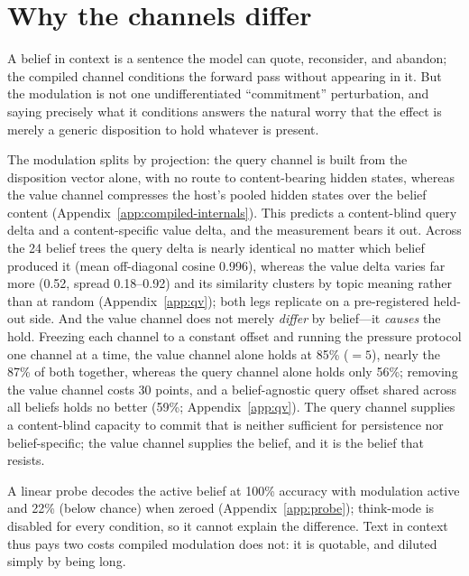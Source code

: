 \section{Why the channels differ}
\label{sec:why-channels-differ}

A belief in context is a sentence the model can quote, reconsider, and abandon; the compiled
channel conditions the forward pass without appearing in it. But the modulation is not one
undifferentiated ``commitment'' perturbation, and saying precisely what it conditions answers
the natural worry that the effect is merely a generic disposition to hold whatever is present.

The modulation splits by projection: the query channel is built from the disposition vector
alone, with no route to content-bearing hidden states, whereas the value channel compresses
the host's pooled hidden states over the belief content (Appendix~\ref{app:compiled-internals}). This
predicts a content-blind query delta and a content-specific value delta, and the measurement
bears it out. Across the 24 belief trees the query delta is nearly identical no matter which
belief produced it (mean off-diagonal cosine 0.996), whereas the value delta varies far more
(0.52, spread 0.18--0.92) and its similarity clusters by topic meaning rather than at random
(Appendix~\ref{app:qv}); both legs replicate on a pre-registered held-out
side. And the value channel does not merely
\emph{differ} by belief---it \emph{causes} the hold. Freezing each channel to a constant offset
and running the pressure protocol one channel at a time, the value channel alone holds at 85\%
(\(=5\)), nearly the 87\% of both together, whereas the query channel alone holds only 56\%;
removing the value channel costs 30 points, and a belief-agnostic query offset shared across all
beliefs holds no better (59\%; Appendix~\ref{app:qv}). The query channel
supplies a content-blind capacity to commit that is neither sufficient for persistence nor
belief-specific; the value channel supplies the belief, and it is the belief that resists.

A linear probe decodes the active belief at 100\% accuracy with modulation active and 22\%
(below chance) when zeroed (Appendix~\ref{app:probe}); think-mode is disabled for every
condition, so it cannot explain the difference. Text in context thus pays two costs compiled
modulation does not: it is quotable, and diluted simply by being long.
